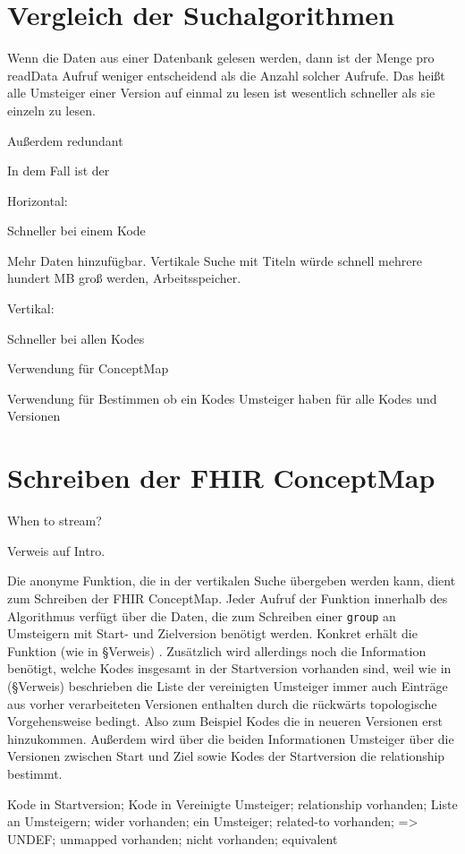 
\section{Vergleich der Suchalgorithmen}

Wenn die Daten aus einer Datenbank gelesen werden, dann ist der Menge pro readData Aufruf weniger entscheidend als die Anzahl solcher Aufrufe. Das heißt alle Umsteiger einer Version auf einmal zu lesen ist wesentlich schneller als sie einzeln zu lesen. 

Außerdem redundant

In dem Fall ist der

Horizontal:

Schneller bei einem Kode

Mehr Daten hinzufügbar. Vertikale Suche mit Titeln würde schnell mehrere hundert MB groß werden, Arbeitsspeicher.

Vertikal:

Schneller bei allen Kodes

Verwendung für ConceptMap

Verwendung für Bestimmen ob ein Kodes Umsteiger haben für alle Kodes und Versionen


\section{Schreiben der FHIR ConceptMap}

When to stream? \cite{braaksma2014streaming}

Verweis auf Intro.

Die anonyme Funktion, die in der vertikalen Suche übergeben werden kann, dient zum Schreiben der FHIR ConceptMap. Jeder Aufruf der Funktion innerhalb des Algorithmus verfügt über die Daten, die zum Schreiben einer \texttt{group} an Umsteigern mit Start- und Zielversion benötigt werden. Konkret erhält die Funktion (wie in §Verweis) .  Zusätzlich wird allerdings noch die Information benötigt, welche Kodes insgesamt in der Startversion vorhanden sind, weil wie in (§Verweis) beschrieben die Liste der vereinigten Umsteiger immer auch Einträge aus vorher verarbeiteten Versionen enthalten durch die rückwärts topologische Vorgehensweise bedingt. Also zum Beispiel Kodes die in neueren Versionen erst hinzukommen. Außerdem wird über die beiden Informationen Umsteiger über die Versionen zwischen Start und Ziel sowie Kodes der Startversion die relationship bestimmt.

Kode in Startversion;  Kode in Vereinigte Umsteiger; relationship
vorhanden; Liste an Umsteigern; wider
vorhanden; ein Umsteiger; related-to
vorhanden; => UNDEF; unmapped
vorhanden; nicht vorhanden; equivalent

